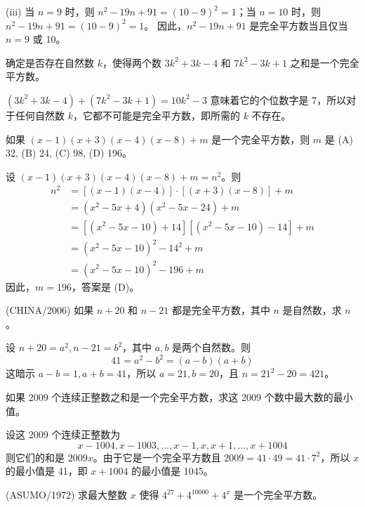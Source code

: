\begin{questions}
\begin{solution}
(iii) 当 $n = 9$ 时，则 $n^2 - 19n + 91 = (10 - 9)^2 = 1$；当 $n = 10$ 时，则 $n^2 - 19n + 91 = (10 - 9)^2 = 1$。
因此，$n^2 - 19n + 91$ 是完全平方数当且仅当 $n = 9$ 或 10。
\end{solution}
\question 确定是否存在自然数 $k$，使得两个数 $3k^2 + 3k - 4$ 和 $7k^2 - 3k + 1$ 之和是一个完全平方数。

\begin{solution}
$(3k^2 + 3k - 4) + (7k^2 - 3k + 1) = 10k^2 - 3$ 意味着它的个位数字是 7，所以对于任何自然数 $k$，它都不可能是完全平方数，即所需的 $k$ 不存在。
\end{solution}

\question 如果 $(x - 1)(x + 3)(x - 4)(x - 8) + m$ 是一个完全平方数，则 $m$ 是
(A) 32, (B) 24, (C) 98, (D) 196。

\begin{solution}
设 $(x - 1)(x + 3)(x - 4)(x - 8) + m = n^2$。则
\begin{align*}
n^2 &= [(x - 1)(x - 4)] \cdot [(x + 3)(x - 8)] + m\\
&= (x^2 - 5x + 4)(x^2 - 5x - 24) + m\\
&= [(x^2 - 5x - 10) + 14][(x^2 - 5x - 10) - 14] + m\\
&= (x^2 - 5x - 10)^2 - 14^2 + m\\
&= (x^2 - 5x - 10)^2 - 196 + m
\end{align*}
因此，$m = 196$，答案是 (D)。
\end{solution}

\question (CHINA/2006) 如果 $n + 20$ 和 $n - 21$ 都是完全平方数，其中 $n$ 是自然数，求 $n$。

\begin{solution}
设 $n + 20 = a^2, n - 21 = b^2$，其中 $a, b$ 是两个自然数。则
\[
41 = a^2 - b^2 = (a - b)(a + b)
\]
这暗示 $a - b = 1, a + b = 41$，所以 $a = 21, b = 20$，且 $n = 21^2 - 20 = 421$。
\end{solution}

\question 如果 2009 个连续正整数之和是一个完全平方数，求这 2009 个数中最大数的最小值。

\begin{solution}
设这 2009 个连续正整数为
\[
x - 1004, x - 1003, \dots, x - 1, x, x + 1, \dots, x + 1004
\]
则它们的和是 $2009x$。由于它是一个完全平方数且 $2009 = 41 \cdot 49 = 41 \cdot 7^2$，所以 $x$ 的最小值是 41，即 $x + 1004$ 的最小值是 1045。
\end{solution}

\question (ASUMO/1972) 求最大整数 $x$ 使得 $4^{27} + 4^{10000} + 4^x$ 是一个完全平方数。


\end{questions}
